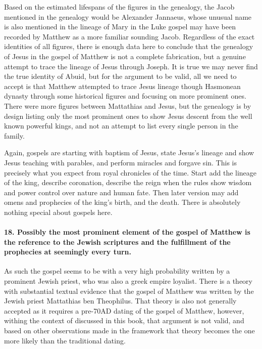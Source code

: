 Based on the estimated lifespans of the figures in the genealogy, the Jacob mentioned in the genealogy would be Alexander Jannaeus, whose unusual name is also mentioned in the lineage of Mary in the Luke gospel may have been recorded by Matthew as a more familiar sounding Jacob.
Regardless of the exact identities of all figures, there is enough data here to conclude that the genealogy of Jesus in the gospel of Matthew is not a complete fabrication, but a genuine attempt to trace the lineage of Jesus through Joseph.
It is true we may never find the true identity of Abuid, but for the argument to be valid, all we need to accept is that Matthew attempted to trace Jesus lineage though Hasmonean dynasty through some historical figures and focusing on more prominent ones.
There were more figures between Mattathias and Jesus, but the genealogy is by design listing only the most prominent ones to show Jesus descent from the well known powerful kings, and not an attempt to list every single person in the family.

Again, gospels are starting with baptism of Jesus, state Jesus's lineage and show Jesus teaching with parables, and perform miracles and forgave sin.
This is precisely what you expect from royal chronicles of the time.
Start add the lineage of the king, describe coronation, describe the reign when the rules show wisdom and power control over nature and human fate.
Then later version may add omens and prophecies of the king's birth, and the death.
There is absolutely nothing special about gospels here.

\paragraph{18.
Possibly the most prominent element of the gospel of Matthew is the reference to the Jewish scriptures and the fulfillment of the prophecies at seemingly every turn.}\label{par:possibly-the-most-prominent-element-of-the-gospel-of-matthew-is-the-reference-to-the-jewish-scriptures-and-the-fulfillment-of-the-prophecies-at-seemingly-every-turn.}

As such the gospel seems to be with a very high probability written by a prominent Jewish priest, who was also a greek empire loyalist.
There is a theory with substantial textual evidence that the gospel of Matthew was written by the Jewish priest Mattathias ben Theophilus.
That theory is also not generally accepted as it requires a pre-70AD dating of the gospel of Matthew, however, withing the context of discussed in this book, that argument is not valid, and based on other observations made in the framework that theory becomes the one more likely than the traditional dating.

